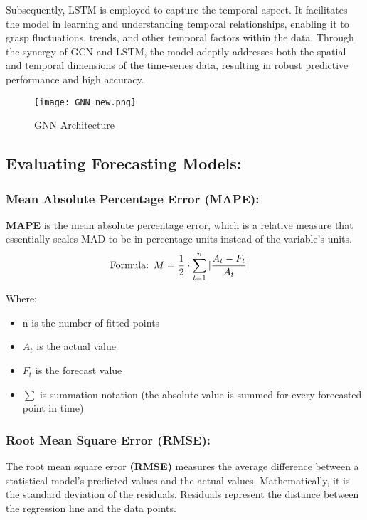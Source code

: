 \documentclass{ieeeojies}
\begin{document}
Subsequently, LSTM is employed to capture the temporal aspect. It facilitates the model in learning and understanding temporal relationships, enabling it to grasp fluctuations, trends, and other temporal factors within the data. Through the synergy of GCN and LSTM, the model adeptly addresses both the spatial and temporal dimensions of the time-series data, resulting in robust predictive performance and high accuracy.
\vspace{6em}
\begin{figure}[ht]
  \centering
  \texttt{[image: GNN\_new.png]}
  \caption{GNN Architecture}
  \label{fig:example}
\end{figure}

\subsection{Evaluating Forecasting Models:}
\subsubsection{\textbf{Mean Absolute Percentage Error (MAPE):}}
\textbf{MAPE} is the mean absolute percentage error, which is a relative measure that essentially scales MAD to be in percentage units instead of the variable’s units.
\begin{align*}
    &\text{Formula:} \hspace{0.5em} M = \frac{1}{2} \cdot \sum_{t=1}^n |\frac{A_t - F_t}{A_t}|
\end{align*}

Where:
\begin{itemize}
    \item n is the number of fitted points
    \item $A_t$ is the actual value
    \item $F_t$ is the forecast value
    \item $\sum$ is summation notation (the absolute value is summed for every forecasted point in time)
\end{itemize}

\subsubsection{\textbf{Root Mean Square Error (RMSE):}}
The root mean square error \textbf{(RMSE)} measures the average difference between a statistical model’s predicted values and the actual values. Mathematically, it is the standard deviation of the residuals. Residuals represent the distance between the regression line and the data points.
\end{document}
